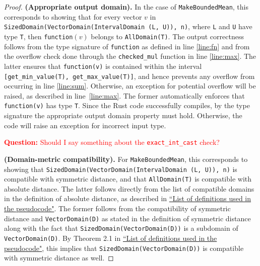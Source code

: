 \documentclass[11pt,a4paper]{article}
\theoremstyle{definition}
\newcommand{\questionc}[1]{\textcolor{red}{\textbf{Question:} #1}}
\newcommand{\silvia}[1]{{ {\color{blue}{(silvia)~#1}}}}
\begin{document}
\begin{proof}
    \textbf{(Appropriate output domain).} In the case of \texttt{MakeBoundedMean}, this corresponds to showing that for every vector $v$ in \texttt{SizedDomain(VectorDomain(IntervalDomain (L, U)), n)}, where \texttt{L} and \texttt{U} have type \texttt{T}, then \texttt{function}$(v)$ belongs to \texttt{AllDomain(T)}. 
    The output correctness follows from the type signature of \texttt{function} as defined in line \ref{line:fn} and from the overflow check done through the \texttt{checked\_mul} function in line \ref{line:max}. The latter ensures that \texttt{function(v)} is contained within the interval \texttt{[get\_min\_value(T), get\_max\_value(T)]}, and hence prevents any overflow from occurring in line \ref{line:sum}. Otherwise, an exception for potential overflow will be raised, as described in line~\ref{line:max}. The former automatically enforces that \texttt{function(v)} has type \texttt{T}. Since the Rust code successfully compiles, by the type signature the appropriate output domain property must hold. Otherwise, the code will raise an exception for incorrect input type.
    
    \questionc{Should I say something about the \texttt{exact\_int\_cast} check?}
    
    \smallskip
    \textbf{(Domain-metric compatibility).} For \texttt{MakeBoundedMean}, this corresponds to showing that \texttt{SizedDomain(VectorDomain(IntervalDomain (L, U)), n)} is compatible with symmetric distance, and that \texttt{AllDomain(T)} is compatible with absolute distance. The latter follows directly from the list of compatible domains in the definition of absolute distance, as described in \href{https://www.overleaf.com/project/60d215bf90b337ac02200a99}{``List of definitions used in the pseudocode"}. The former follows from the compatibility of symmetric distance and \texttt{VectorDomain(D)} as stated in the definition of symmetric distance along with the fact that \texttt{SizedDomain(VectorDomain(D))} is a subdomain of \texttt{VectorDomain(D)}. By Theorem 2.1 in \href{https://www.overleaf.com/project/60d215bf90b337ac02200a99}{``List of definitions used in the pseudocode"}, this implies that \texttt{SizedDomain(VectorDomain(D))} is compatible with symmetric distance as well. 
    
    \silvia{Flag: this is an example of the subdomain issues that we have been discussing during the week of July 19. Hence this paragraph might need some phrasing updates when the compatibility pairing constructor and the subdomain trait are implemented.}
    

\end{proof}
\end{document}
